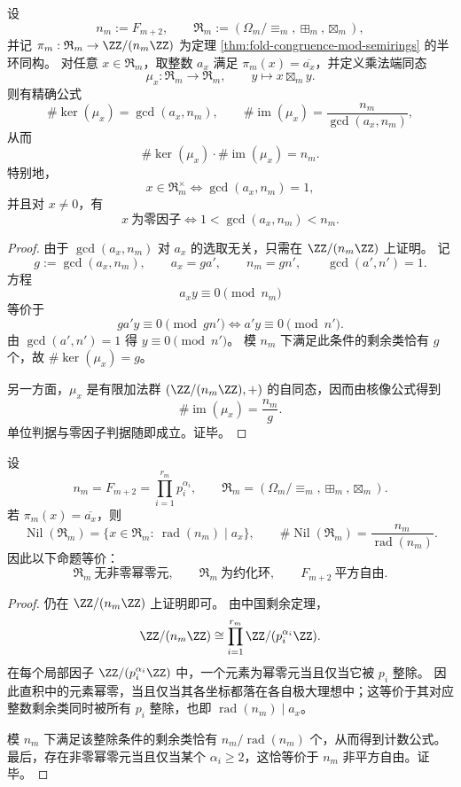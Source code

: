\begin{theorem}\label{thm:fold-mod-semirings-kernel-image-gcd}
设
\[
n_m:=F_{m+2},
\qquad
\mathfrak R_m:=(\Omega_m/\!\equiv_m,\boxplus_m,\boxtimes_m),
\]
并记 \(\pi_m:\mathfrak R_m\to \ZZ/(n_m\ZZ)\) 为定理 \ref{thm:fold-congruence-mod-semirings} 的半环同构。
对任意 \(x\in \mathfrak R_m\)，取整数 \(a_x\) 满足 \(\pi_m(x)=\overline{a_x}\)，并定义乘法端同态
\[
\mu_x:\mathfrak R_m\to \mathfrak R_m,
\qquad
y\longmapsto x\boxtimes_m y.
\]
则有精确公式
\[
\#\ker(\mu_x)=\gcd(a_x,n_m),
\qquad
\#\operatorname{im}(\mu_x)=\frac{n_m}{\gcd(a_x,n_m)},
\]
从而
\[
\#\ker(\mu_x)\cdot \#\operatorname{im}(\mu_x)=n_m.
\]
特别地，
\[
x\in \mathfrak R_m^\times
\iff
\gcd(a_x,n_m)=1,
\]
并且对 \(x\neq 0\)，有
\[
x\ \text{为零因子}
\iff
1<\gcd(a_x,n_m)<n_m.
\]
\end{theorem}
\begin{proof}
由于 \(\gcd(a_x,n_m)\) 对 \(a_x\) 的选取无关，只需在 \(\ZZ/(n_m\ZZ)\) 上证明。
记
\[
g:=\gcd(a_x,n_m),
\qquad
a_x=g a',
\qquad
n_m=g n',
\qquad
\gcd(a',n')=1.
\]
方程
\[
a_x y\equiv 0\pmod{n_m}
\]
等价于
\[
g a' y\equiv 0\pmod{g n'}
\iff
a'y\equiv 0\pmod{n'}.
\]
由 \(\gcd(a',n')=1\) 得 \(y\equiv 0\pmod{n'}\)。
模 \(n_m\) 下满足此条件的剩余类恰有 \(g\) 个，故 \(\#\ker(\mu_x)=g\)。

另一方面，\(\mu_x\) 是有限加法群 \((\ZZ/(n_m\ZZ),+)\) 的自同态，因而由核像公式得到
\[
\#\operatorname{im}(\mu_x)=\frac{n_m}{g}.
\]
单位判据与零因子判据随即成立。证毕。
\end{proof}

\begin{theorem}[平方自由分岔与幂零层的精确计数]\label{thm:fold-mod-semirings-squarefree-nilpotent-branch}
设
\[
n_m=F_{m+2}=\prod_{i=1}^{r_m} p_i^{\alpha_i},
\qquad
\mathfrak R_m=(\Omega_m/\!\equiv_m,\boxplus_m,\boxtimes_m).
\]
若 \(\pi_m(x)=\overline{a_x}\)，则
\[
\operatorname{Nil}(\mathfrak R_m)
=
\{x\in \mathfrak R_m:\ \operatorname{rad}(n_m)\mid a_x\},
\qquad
\#\operatorname{Nil}(\mathfrak R_m)=\frac{n_m}{\operatorname{rad}(n_m)}.
\]
因此以下命题等价：
\[
\mathfrak R_m\ \text{无非零幂零元},
\qquad
\mathfrak R_m\ \text{为约化环},
\qquad
F_{m+2}\ \text{平方自由}.
\]
\end{theorem}
\begin{proof}
仍在 \(\ZZ/(n_m\ZZ)\) 上证明即可。
由中国剩余定理，
\[
\ZZ/(n_m\ZZ)\cong \prod_{i=1}^{r_m}\ZZ/(p_i^{\alpha_i}\ZZ).
\]
在每个局部因子 \(\ZZ/(p_i^{\alpha_i}\ZZ)\) 中，一个元素为幂零元当且仅当它被 \(p_i\) 整除。
因此直积中的元素幂零，当且仅当其各坐标都落在各自极大理想中；这等价于其对应整数剩余类同时被所有 \(p_i\) 整除，也即 \(\operatorname{rad}(n_m)\mid a_x\)。

模 \(n_m\) 下满足该整除条件的剩余类恰有 \(n_m/\operatorname{rad}(n_m)\) 个，从而得到计数公式。
最后，存在非零幂零元当且仅当某个 \(\alpha_i\ge 2\)，这恰等价于 \(n_m\) 非平方自由。证毕。
\end{proof}

